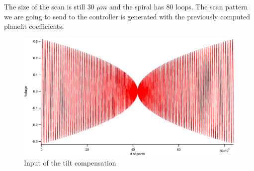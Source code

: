 The size of the scan is still 30 $\mu m$ and the spiral has 80 loops. The scan pattern we are going to send to the controller is generated with the previously computed planefit coefficients. 

\begin{figure}[H]
  \centering
  \includegraphics[scale=0.4]{images/spiralztiltout.eps}
    \caption{Input of the tilt compensation}
  \label{spiralztiltout}
\end{figure}

